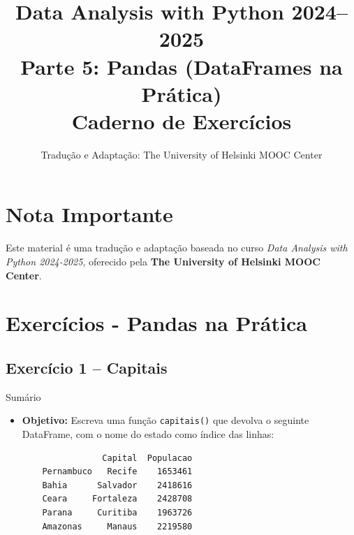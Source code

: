 \documentclass[11pt,a4paper]{article}
\title{\textbf{Data Analysis with Python 2024--2025}\\Parte 5: Pandas (DataFrames na Prática)\\\large Caderno de Exercícios}
\author{Tradução e Adaptação: The University of Helsinki MOOC Center}
\date{}
\begin{document}
\maketitle

\section*{Nota Importante}
Este material é uma tradução e adaptação baseada no curso \textit{Data Analysis with Python 2024-2025}, oferecido pela \textbf{The University of Helsinki MOOC Center}.

\tableofcontents
\newpage

\section{Exercícios - Pandas na Prática}

\subsection*{Exercício 1 -- Capitais}
\begin{exercicio}{Sumário}
\begin{itemize}
    \item \textbf{Objetivo:} Escreva uma função \texttt{capitais()} que devolva o seguinte DataFrame, com o nome do estado como índice das linhas:
    \begin{verbatim}
                Capital  Populacao
    Pernambuco   Recife    1653461
    Bahia      Salvador    2418616
    Ceara     Fortaleza    2428708
    Parana     Curitiba    1963726
    Amazonas     Manaus    2219580
    \end{verbatim}
\end{itemize}
\end{exercicio}
\end{document}
